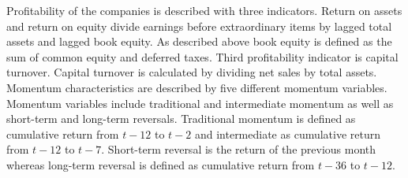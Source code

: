 \documentclass{article}
\begin{document}
Profitability of the companies is described with three indicators. Return on assets and return on equity divide earnings before extraordinary items by lagged total assets and lagged book equity. As described above book equity is defined as the sum of common equity and deferred taxes. Third profitability indicator is capital turnover. Capital turnover is calculated by dividing net sales by total assets. Momentum characteristics are described by five different momentum variables. Momentum variables include traditional and intermediate momentum as well as short-term and long-term reversals. Traditional momentum is defined as cumulative return from $t-12$ to $t-2$ and intermediate as cumulative return from $t-12$ to $t-7$. Short-term reversal is the return of the previous month whereas long-term reversal is defined as cumulative return from $t-36$ to $t-12$. \par
\end{document}
